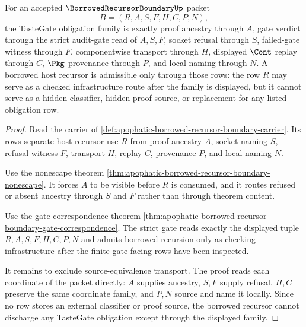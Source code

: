 \begin{theorem}
\label{thm:borrowed-recursor-boundary-tastegate-obligation-family}
For an accepted $\BorrowedRecursorBoundaryUp$ packet
$$
B=(R,A,S,F,H,C,P,N),
$$
the TasteGate obligation family is exactly proof ancestry through $A$, gate verdict through the strict audit-gate read of $A,S,F$, socket refusal through $S$, failed-gate witness through $F$, componentwise transport through $H$, displayed $\Cont$ replay through $C$, $\Pkg$ provenance through $P$, and local naming through $N$. A borrowed host recursor is admissible only through those rows: the row $R$ may serve as a checked infrastructure route after the family is displayed, but it cannot serve as a hidden classifier, hidden proof source, or replacement for any listed obligation row.
\end{theorem}
\begin{proof}
Read the carrier of \autoref{def:apophatic-borrowed-recursor-boundary-carrier}. Its rows separate host recursor use $R$ from proof ancestry $A$, socket naming $S$, refusal witness $F$, transport $H$, replay $C$, provenance $P$, and local naming $N$.

Use the nonescape theorem \autoref{thm:apophatic-borrowed-recursor-boundary-nonescape}. It forces $A$ to be visible before $R$ is consumed, and it routes refused or absent ancestry through $S$ and $F$ rather than through theorem content.

Use the gate-correspondence theorem \autoref{thm:apophatic-borrowed-recursor-boundary-gate-correspondence}. The strict gate reads exactly the displayed tuple $R,A,S,F,H,C,P,N$ and admits borrowed recursion only as checking infrastructure after the finite gate-facing rows have been inspected.

It remains to exclude source-equivalence transport. The proof reads each coordinate of the packet directly: $A$ supplies ancestry, $S,F$ supply refusal, $H,C$ preserve the same coordinate family, and $P,N$ source and name it locally. Since no row stores an external classifier or proof source, the borrowed recursor cannot discharge any TasteGate obligation except through the displayed family.
\end{proof}



